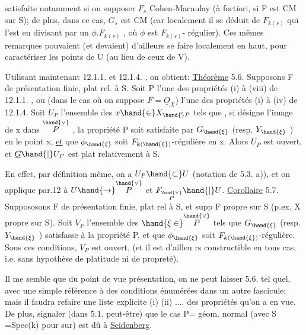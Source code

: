 
satisfaite notamment si on supposer $F_s$ Cohen-Macaulay (à fortiori, si
F est CM sur S); de plus, dans ce cas, $G_s$ est CM (car localement il se
déduit de $F_{k(s)}$ qui l'est en divisant par un $\phi . F_{k(s)}$ ,  où $\phi$ est $F_{k(s)}$-%
régulier). Ces mêmes remarques pouvaient (et devaient) d'ailleurs se faire localement
en haut, pour caractériser les points de U (au lieu de ceux de V).

Utilisant maintenant 12.1.1. et 12.1.4. , on obtient:
\uline{Théorème} 5.6. Supposons F de présentation finie, plat rel. à S. Soit
P l'une des propriétés 
 (i) à (viii) de 12.1.1. ,
ou  (dans le cas où on suppose $F=\underline{O}_X$) l'une des
 propriétés (i) à (iv)\hand{/} de 12.1.4. Soit
 $U_P$  l'ensemble des $x \hand{\in} X_{\hand{\check{}}P}$ tels que , si \hand{$\xi$}
 désigne l'image de x dans $\overset{\hand{\vee}}{P}$ , la propriété P soit satisfaite
par $G_{\hand{\xi}}$ (resp.  $Y_{\hand{\xi}}$ ) en le point x, \uline{et} que $\phi_{\hand{\xi}}$ soit $F_{k(\hand{\xi})}$-régulière en x.
Alors $U_P$ est ouvert, et $\underline{G}\hand{|}U_P$ est plat relativement à S.

En effet, par définition même, on a $U_P \hand{\subset} U$ (notation de 5.3. a)),
et on applique par.12 à $U \hand{\to} \overset{\hand{\vee}}{P}$ et $F_{\overset{\hand{\vee}}{P}}\hand{|}U$.
\uline{Corollaire} 5.7. Suppososons F de présentation finie, plat rel à S,
et supp F propre sur S (p.ex. X propre sur S). Soit $V_P$ l'ensemble des
$\hand{\xi\in}\overset{\hand{\vee}}{P}$ tels que $G_{\hand{\xi}}$ (resp. $Y_{\hand{\xi}}$ ) satisfasse à la propriété P, et que $\phi_{\hand{\xi}}$ soit
$F_{k(\hand{\xi})}$-régulière. Sous ces conditions, $V_P$ est ouvert, (et il est d'ailleu
rs constructible en tous cas, i.e. sans hypothèse de platitude ni de
propreté).

Il me semble que du point de vue présentation, on ne peut laisser
5.6. tel quel, avec une simple référence à des conditions énumérées dans
un autre fascicule; mais il faudra refaire une liste explicite (i) (ii)
.... des propriétés qu'on a en vue. De plus, signaler (dans 5.1. peut-être) que le cas P= géom.
normal (avec S =Spec(k) pour sur) est dû à \uline{Seidenberg}.


